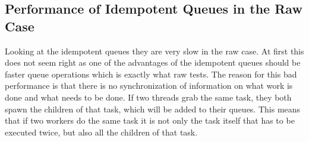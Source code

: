 \subsection{Performance of Idempotent Queues in the Raw Case}
Looking at the idempotent queues they are very slow in the raw case. At first this does not seem right as one of the advantages of the idempotent queues should be faster queue operations which is exactly what raw tests. The reason for this bad performance is that there is no synchronization of information on what work is done and what needs to be done. If two threads grab the same task, they both spawn the children of that task, which will be added to their queues. This means that if two workers do the same task it is not only the task itself that has to be executed twice, but also all the children of that task.
